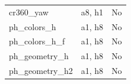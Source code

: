 \begin{longtable}{>{\raggedright\arraybackslash}p{.47\linewidth}>{\raggedright\arraybackslash}p{.25\linewidth}l}
cr360\_\allowbreak{}yaw & %
a8, h1 & %
No \\ %

ph\_\allowbreak{}colors\_\allowbreak{}h & %
a1, h8 & %
No \\ %

ph\_\allowbreak{}colors\_\allowbreak{}h\_\allowbreak{}f & %
a1, h8 & %
No \\ %

ph\_\allowbreak{}geometry\_\allowbreak{}h & %
a1, h8 & %
No \\ %

ph\_\allowbreak{}geometry\_\allowbreak{}h2 & %
a1, h8 & %
No \\ %


\end{longtable}
